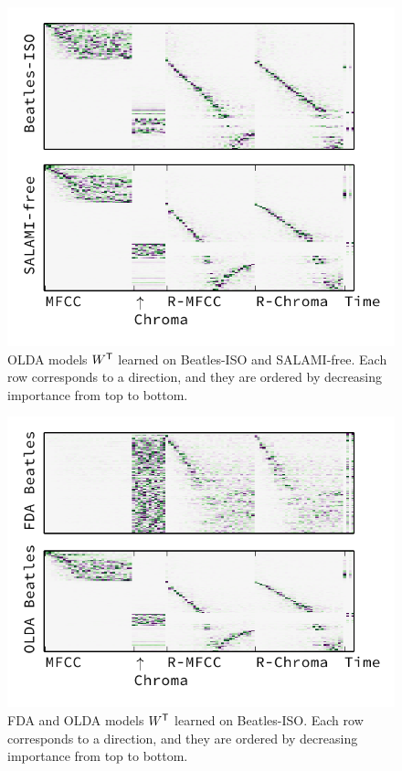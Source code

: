 \documentclass{article}
\begin{document}
\begin{figure}
\flushright%
\includegraphics[width=\columnwidth]{figs/w}%
\vspace{-\baselineskip}%
\caption{OLDA models $W^\mathsf{T}$ learned on Beatles-ISO and SALAMI-free. Each row corresponds to a direction, 
and they are ordered by decreasing importance from top to bottom.\label{fig:w}}
\end{figure}

\begin{figure}
\flushright%
\includegraphics[width=\columnwidth]{figs/fda-vs-olda}%
\vspace{-\baselineskip}%
\caption{FDA and OLDA models $W^\mathsf{T}$ learned on Beatles-ISO. Each row corresponds to a direction, 
and they are ordered by decreasing importance from top to bottom.\label{fig:fda-vs-olda}}
\end{figure}
\end{document}

